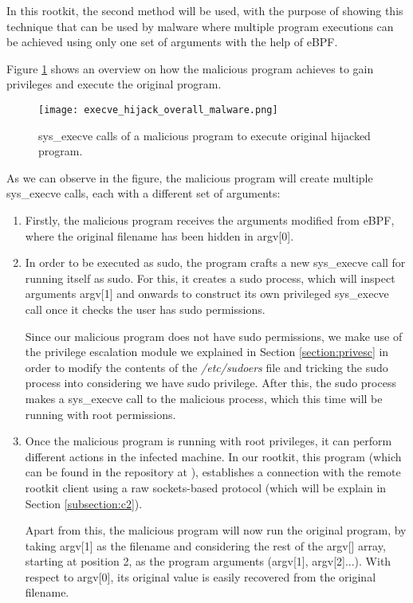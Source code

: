 In this rootkit, the second method will be used, with the purpose of showing this technique that can be used by malware where multiple program executions can be achieved using only one set of arguments with the help of eBPF.

Figure \ref{fig:execve_hijack_overall_malware} shows an overview on how the malicious program achieves to gain privileges and execute the original program.

\begin{figure}[htbp]
	\centering
	\texttt{[image: execve\_hijack\_overall\_malware.png]}
	\caption{sys\_execve calls of a malicious program to execute original hijacked program.}
	\label{fig:execve_hijack_overall_malware}
\end{figure}

As we can observe in the figure, the malicious program will create multiple sys\_execve calls, each with a different set of arguments:
\begin{enumerate}
\item Firstly, the malicious program receives the arguments modified from eBPF, where the original filename has been hidden in argv[0].
\item In order to be executed as sudo, the program crafts a new sys\_execve call for running itself as sudo. For this, it creates a sudo process, which will inspect arguments argv[1] and onwards to construct its own privileged sys\_execve call once it checks the user has sudo permissions. 

Since our malicious program does not have sudo permissions, we make use of the privilege escalation module we explained in Section \ref{section:privesc} in order to modify the contents of the \textit{/etc/sudoers} file and tricking the sudo process into considering we have sudo privilege. After this, the sudo process makes a sys\_execve call to the malicious process, which this time will be running with root permissions.

\item Once the malicious program is running with root privileges, it can perform different actions in the infected machine. In our rootkit, this program (which can be found in the repository at \cite{repo_execve_hijack}), establishes a connection with the remote rootkit client using a raw sockets-based protocol (which will be explain in Section \ref{subsection:c2}).

Apart from this, the malicious program will now run the original program, by taking argv[1] as the filename and considering the rest of the argv[] array, starting at position 2, as the program arguments (argv[1], argv[2]...). With respect to argv[0], its original value is easily recovered from the original filename. 

\end{enumerate}



